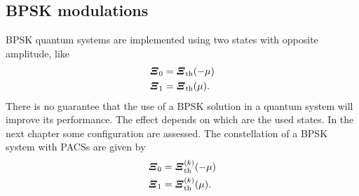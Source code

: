     \subsection{BPSK modulations}
        BPSK quantum systems are implemented using two states with opposite amplitude, like
        \begin{equation}\begin{split}
            \Operator{\varXi}_0 &= \Operator{\varXi}_{\mathrm{th}}(-\mu)\\
            \Operator{\varXi}_1 &= \Operator{\varXi}_{\mathrm{th}}(\mu).
            \label{eq:2.1.2}
        \end{split}\end{equation}
        There is no guarantee that the use of a BPSK solution in  a quantum system will 
        improve its performance. The effect depends on which are the used states. In the next chapter some 
        configuration are assessed. The constellation of a BPSK system with PACSs are given by
        \begin{equation}\begin{split}
            \Operator{\varXi}_0 &= \Operator{\varXi}_{\mathrm{th}}^{(k)}(-\mu)\\
            \Operator{\varXi}_1 &= \Operator{\varXi}_{\mathrm{th}}^{(k)}(\mu).
            \label{eq:2.1.25}
        \end{split}\end{equation}
